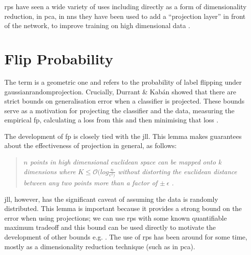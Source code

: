 \gls{rp}s have seen a wide variety of uses including directly as a form of dimensionality reduction, in \gls{pca}, in \gls{nn}s they have been used to add a \enquote{projection layer} in front of the network, to improve training on high dimensional data \cite{random_project_high_d}.


\section{Flip Probability}

The term  is a geometric one and refers to the probability of label flipping under \gls{gaussianrandomprojection}. Crucially, Durrant \& Kab\'an showed that there are strict bounds on generalisation error when a classifier is projected. These bounds serve as a motivation for projecting the classifier and the data, measuring the empirical \gls{fp}, calculating a loss from this and then minimising that loss \cite{bob_sharp_generalisation_error_bounds}.
\bigskip 

The development of \gls{fp} is closely tied with the \gls{jll}. This lemma makes guarantees about the effectiveness of projection in general, as follows:

\begin{quote}
    \textit{$n$ points in high dimensional euclidean space can be mapped onto k dimensions where $K \leq \mathcal{O}(log \frac{n}{\epsilon^{2})} $ without distorting the euclidean distance between any two points more than a factor of $\pm \: \epsilon$ \cite{jll_notes}.}
\end{quote}

\Gls{jll}, however, has the significant caveat of assuming the data is randomly distributed. This lemma is important because it provides a strong bound on the error when using projections; we can use \gls{rp}s with some known quantifiable maximum tradeoff and this bound can be used directly to motivate the development of other bounds e.g. \cite{bob_sharp_generalisation_error_bounds}.  The use of \gls{rp}s has been around for some time, mostly as a dimensionality reduction technique (such as in \gls{pca}).
\bigskip


